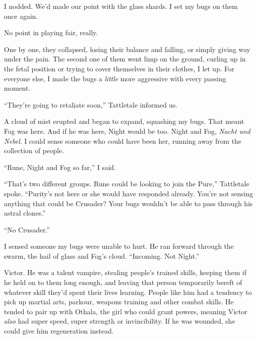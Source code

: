 I nodded.  We'd made our point with the glass shards.  I set my bugs on them once again.



No point in playing fair, really.



One by one, they collapsed, losing their balance and falling, or simply giving way under the pain.  The second one of them went limp on the ground, curling up in the fetal position or trying to cover themselves in their clothes, I let up.  For everyone else, I made the bugs a \emph{little} more aggressive with every passing moment.



``They're going to retaliate soon,'' Tattletale informed us.



A cloud of mist erupted and began to expand, squashing my bugs.  That meant Fog was here.  And if he was here, Night would be too.  Night and Fog, \emph{Nacht und Nebel}.  I could sense someone who could have been her, running away from the collection of people.



``Rune, Night and Fog so far,'' I said.



``That's two different groups.  Rune could be looking to join the Pure,'' Tattletale spoke.  ``Purity's not here or she would have responded already.  You're not sensing anything that could be Crusader?  Your bugs wouldn't be able to pass through his astral clones.''



``No Crusader.''



I sensed someone my bugs were unable to hurt.  He ran forward through the swarm, the hail of glass and Fog's cloud.  ``Incoming.  Not Night.''



Victor.  He was a talent vampire, stealing people's trained skills, keeping them if he held on to them long enough, and leaving that person temporarily bereft of whatever skill they'd spent their lives learning.  People like him had a tendency to pick up martial arts, parkour, weapons training and other combat skills.  He tended to pair up with Othala, the girl who could grant powers, meaning Victor \emph{also} had super speed, super strength or invincibility.  If he was wounded, she could give him regeneration instead.




